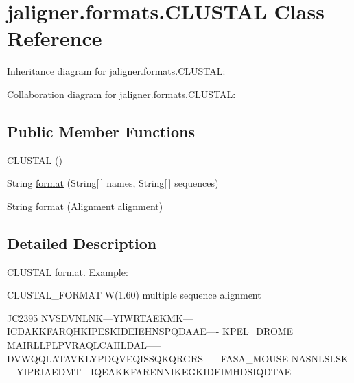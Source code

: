 \hypertarget{classjaligner_1_1formats_1_1_c_l_u_s_t_a_l}{\section{jaligner.\+formats.\+C\+L\+U\+S\+T\+A\+L Class Reference}
\label{classjaligner_1_1formats_1_1_c_l_u_s_t_a_l}
}


Inheritance diagram for jaligner.\+formats.\+C\+L\+U\+S\+T\+A\+L\+:


Collaboration diagram for jaligner.\+formats.\+C\+L\+U\+S\+T\+A\+L\+:
\subsection*{Public Member Functions}
\begin{DoxyCompactItemize}
\item 
\hyperlink{classjaligner_1_1formats_1_1_c_l_u_s_t_a_l_a4b5118b8e370a08699645a1ff0571fd3}{C\+L\+U\+S\+T\+A\+L} ()
\item 
String \hyperlink{classjaligner_1_1formats_1_1_c_l_u_s_t_a_l_acb00e8b3f46f288d24e3cb0e4434a154}{format} (String\mbox{[}$\,$\mbox{]} names, String\mbox{[}$\,$\mbox{]} sequences)
\item 
String \hyperlink{classjaligner_1_1formats_1_1_c_l_u_s_t_a_l_a90a7e27321a5ccc925b3a55684821a54}{format} (\hyperlink{classjaligner_1_1_alignment}{Alignment} alignment)
\end{DoxyCompactItemize}


\subsection{Detailed Description}
\hyperlink{classjaligner_1_1formats_1_1_c_l_u_s_t_a_l}{C\+L\+U\+S\+T\+A\+L} format. Example\+: 
\begin{DoxyPre}

\footnotesize 
CLUSTAL\_FORMAT W(1.60) multiple sequence alignment
\normalsize \end{DoxyPre}



\begin{DoxyPre}
\footnotesize JC2395          NVSDVNLNK---YIWRTAEKMK---ICDAKKFARQHKIPESKIDEIEHNSPQDAAE----
KPEL\_DROME      MAIRLLPLPVRAQLCAHLDAL-----DVWQQLATAVKLYPDQVEQISSQKQRGRS-----
FASA\_MOUSE      NASNLSLSK---YIPRIAEDMT---IQEAKKFARENNIKEGKIDEIMHDSIQDTAE----
\normalsize \end{DoxyPre}



